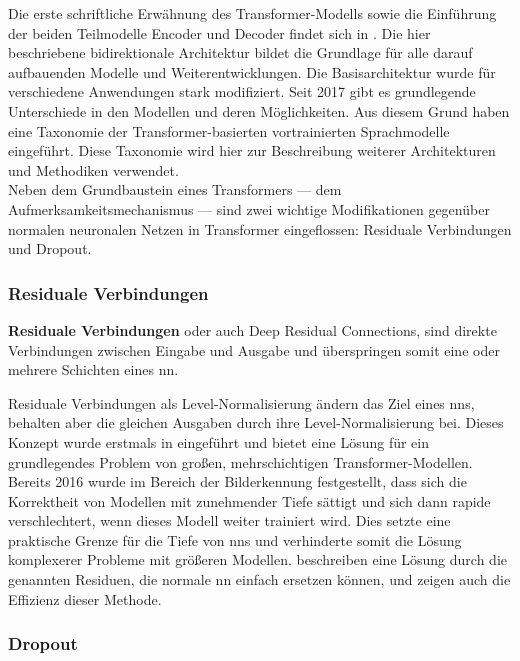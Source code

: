 Die erste schriftliche Erwähnung des Transformer-Modells sowie die Einführung der beiden Teilmodelle Encoder und Decoder findet sich in \citet{attention}.
Die hier beschriebene bidirektionale Architektur bildet die Grundlage für alle darauf aufbauenden Modelle und Weiterentwicklungen.
Die Basisarchitektur wurde für verschiedene Anwendungen stark modifiziert.
Seit 2017 gibt es grundlegende Unterschiede in den Modellen und deren Möglichkeiten.
Aus diesem Grund haben \citet{ammus} eine Taxonomie der Transformer-basierten vortrainierten Sprachmodelle eingeführt.
Diese Taxonomie wird hier zur Beschreibung weiterer Architekturen und Methodiken verwendet.\\

Neben dem Grundbaustein eines Transformers --- dem Aufmerksamkeitsmechanismus --- sind zwei wichtige Modifikationen gegenüber normalen neuronalen Netzen in Transformer eingeflossen: Residuale Verbindungen und Dropout.\\

\subsubsection{Residuale Verbindungen}

\begin{definition}\label{def:residuale-verbindungen}
    \textbf{Residuale Verbindungen} oder auch Deep Residual Connections, sind direkte Verbindungen zwischen Eingabe und Ausgabe und überspringen somit eine oder mehrere Schichten eines \ac{nn}.
\end{definition}
Residuale Verbindungen als Level-Normalisierung ändern das Ziel eines \ac{nn}s, behalten aber die gleichen Ausgaben durch ihre Level-Normalisierung bei.
Dieses Konzept wurde erstmals in \citet{deep_residual} eingeführt und bietet eine Lösung für ein grundlegendes Problem von großen, mehrschichtigen Transformer-Modellen.
Bereits 2016 wurde im Bereich der Bilderkennung festgestellt, dass sich die Korrektheit von Modellen mit zunehmender Tiefe sättigt und sich dann rapide verschlechtert, wenn dieses Modell weiter trainiert wird.
Dies setzte eine praktische Grenze für die Tiefe von \ac{nn}s und verhinderte somit die Lösung komplexerer Probleme mit größeren Modellen.
\citet{deep_residual} beschreiben eine Lösung durch die genannten Residuen, die normale \ac{nn} einfach ersetzen können, und zeigen auch die Effizienz dieser Methode.\\

\subsubsection{Dropout}

